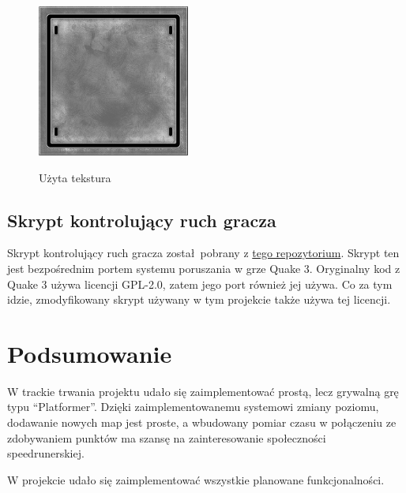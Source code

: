 \documentclass[10pt,a4paper]{article}
\begin{document}
\begin{figure}[ht]
	\centering
	\includegraphics[height=5cm]{../Assets/Textures/mtl_o_s.png}
	\label{fig:mtlo}
	\caption{Użyta tekstura}
\end{figure}

\subsection{Skrypt kontrolujący ruch gracza}\label{sec:quake-movement}

Skrypt kontrolujący ruch gracza został pobrany z
\href{https://github.com/WiggleWizard/quake3-movement-unity3d}{tego repozytorium}.
Skrypt ten jest bezpośrednim portem systemu poruszania w grze Quake 3. Oryginalny
kod z Quake 3 używa licencji GPL-2.0, zatem jego port również jej używa. Co za
tym idzie, zmodyfikowany skrypt używany w tym projekcie także używa tej
licencji.

\section{Podsumowanie}
W trackie trwania projektu udało się zaimplementować prostą, lecz grywalną grę
typu ``Platformer''. Dzięki zaimplementowanemu systemowi zmiany poziomu,
dodawanie nowych map jest proste, a wbudowany pomiar czasu w połączeniu ze
zdobywaniem punktów ma szansę na zainteresowanie społeczności speedrunerskiej.

W projekcie udało się zaimplementować wszystkie planowane funkcjonalności.
\end{document}
